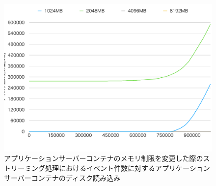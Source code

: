 \documentclass[../../../../../main]{subfiles}
\begin{document}
    \begin{figure}[H]
        \centering
        \includegraphics[width=12cm]{graph}
        \caption{アプリケーションサーバーコンテナのメモリ制限を変更した際のストリーミング処理におけるイベント件数に対するアプリケーションサーバーコンテナのディスク読み込み}
        \label{fig:stream-change-app-memory-limit-app-disk-out-app_4_db_1_1024}
    \end{figure}
\end{document}

